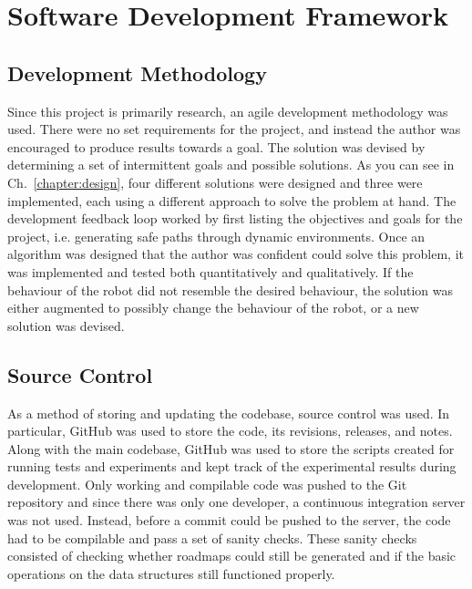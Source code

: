 


\chapter{Software Development Framework}

\label{chapter:software}

\section{Development Methodology}

Since this project is primarily research, an agile development methodology was
used. There were no set requirements for the project, and instead the author
was encouraged to produce results towards a goal. The solution was devised by
determining a set of intermittent goals and possible solutions. As you can see
in Ch.~\ref{chapter:design}, four different solutions were designed and three
were implemented, each using a different approach to solve the problem at hand.
The development feedback loop worked by first listing the objectives and goals
for the project, i.e. generating safe paths through dynamic environments. Once
an algorithm was designed that the author was confident could solve this
problem, it was implemented and tested both quantitatively and qualitatively.
If the behaviour of the robot did not resemble the desired behaviour, the
solution was either augmented to possibly change the behaviour of the robot, or
a new solution was devised.

\section{Source Control}

As a method of storing and updating the codebase, source control was used. In
particular, GitHub was used to store the code, its revisions, releases, and
notes. Along with the main codebase, GitHub was used to store the scripts
created for running tests and experiments and kept track of the experimental
results during development. Only working and compilable code was pushed to the
Git repository and since there was only one developer, a continuous integration
server was not used. Instead, before a commit could be pushed to the server,
the code had to be compilable and pass a set of sanity checks. These sanity
checks consisted of checking whether roadmaps could still be generated and if
the basic operations on the data structures still functioned properly.


